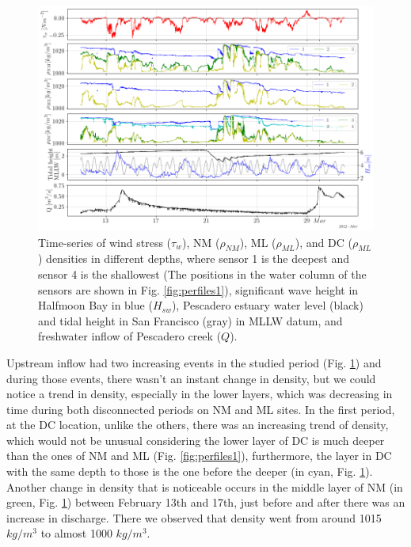 \documentclass[tesis.tex]{subfiles}
\begin{document}
\begin{figure}[h!]
    \centering
    \includegraphics[width=\textwidth]{Imagenes/dens.png}
    \caption{Time-series of wind stress ($\tau_w$), NM ($\rho_{NM}$), ML ($\rho_{ML}$), and DC ($\rho_{ML}$) densities in different depths, where sensor 1 is the deepest and sensor 4 is the shallowest (The positions in the water column of the sensors are shown in Fig. \ref{fig:perfiles1}), significant wave height in Halfmoon Bay in blue ($H_{sw}$), Pescadero estuary water level (black) and tidal height in San Francisco (gray) in MLLW datum, and freshwater inflow of Pescadero creek ($Q$).}
    \label{fig:dens}
\end{figure}


Upstream inflow had two increasing events in the studied period (Fig. \ref{fig:dens}) and during those events, there wasn't an instant change in density, but we could notice a trend in density, especially in the lower layers, which was decreasing in time during both disconnected periods on NM and ML sites. In the first period, at the DC location, unlike the others, there was an increasing trend of density, which would not be unusual considering the lower layer of DC is much deeper than the ones of NM and ML (Fig. \ref{fig:perfiles1}), furthermore, the layer in DC with the same depth to those is the one before the deeper (in cyan, Fig. \ref{fig:dens}). Another change in density that is noticeable occurs in the middle layer of NM (in green, Fig. \ref{fig:dens}) between February 13th and 17th, just before and after there was an increase in discharge. There we observed that density went from around 1015 $kg/m^3$ to almost 1000 $kg/m^3$. \\
\end{document}
